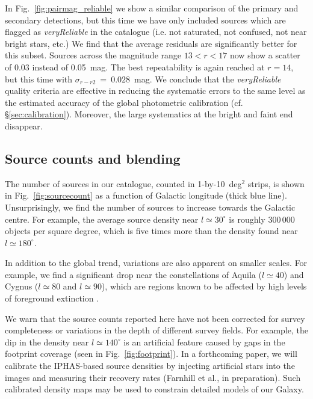 \documentclass[useAMS,usenatbib]{mn2e}
\begin{document}
In Fig.~\ref{fig:pairmag_reliable} we show 
a similar comparison of the primary and secondary detections,
but this time we have only included sources which are flagged
as \emph{veryReliable} in the catalogue
(i.e. not saturated, not confused, not near bright stars, etc.)
We find that the average residuals are significantly better
for this subset. Sources across the magnitude range 
$13 < r < 17$ now show a scatter of 0.03 instead of 0.05~mag.
The best repeatability is again reached at $r=14$,
but this time with $\sigma_{r-r2}~=~0.028$~mag.
We conclude that the \emph{veryReliable} quality criteria are effective
in reducing the systematic errors to
the same level as the estimated accuracy of the
global photometric calibration (cf. \S\ref{sec:calibration}).
Moreover, the large systematics at the bright and faint end
disappear.

\subsection{Source counts and blending}
\label{sec:densities}

The number of sources in our catalogue,
counted in 1-by-10~deg$^2$ strips,
is shown in Fig.~\ref{fig:sourcecount}
as a function of Galactic longitude (thick blue line).	
Unsurprisingly, we find the number of sources
to increase towards the Galactic centre.
For example, the average source density near $l\simeq 30^\circ$
is roughly 300\,000 objects per square degree,
which is five times more than the density
found near $l\simeq 180^\circ$.

In addition to the global trend,
variations are also apparent on smaller scales.
For example, we find a significant drop near the constellations 
of Aquila ($l\simeq40$) and Cygnus ($l\simeq80$ and $l\simeq90$),
which are regions known to be affected
by high levels of foreground extinction
\citep[known as `the Great Rift', e.g.][]{BokBok}.

We warn that the source counts reported here 
have not been corrected for survey completeness
or variations in the depth of different survey fields.
For example, the dip in the density near $l\simeq140^\circ$
is an artificial feature caused by gaps
in the footprint coverage (seen in Fig.~\ref{fig:footprint}).
In a forthcoming paper,
we will calibrate the IPHAS-based source densities
by injecting artificial stars into the images
and measuring their recovery rates
(Farnhill et al., in preparation).
Such calibrated density maps may be used 
to constrain detailed models of our Galaxy.
\end{document}
